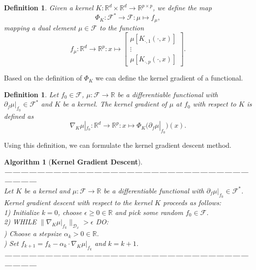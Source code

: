\documentclass[11pt, a4paper]{article}
\newtheorem{definition}[theorem]{Definition}
\newtheorem{algorithm}[theorem]{Algorithm}
\newcommand{\R}{\mathds{R}}
\newcommand{\D}{\mathcal{D}}
\newcommand{\F}{\mathcal{F}}
\begin{document}
\begin{definition}
Given a kernel $K: \R^d \times \R^d \to \R^{p \times p}$, we define the map
\[ \Phi_K : \F^* \to \F : \mu \mapsto f_{\mu}, \]
mapping a dual element $\mu \in \F$ to the function
\[ f_{\mu} : \R^d \to \R^p : x \mapsto \begin{bmatrix} \mu [K_{\cdot,1}(\cdot,x) ] \\ \vdots \\ \mu [ K_{\cdot,p}(\cdot,x)] \end{bmatrix}. \]
\end{definition}

Based on the definition of $\Phi_K$ we can define the kernel gradient of a functional.

\begin{definition}
Let $f_0 \in \F$, $\mu : \F \to \R$ be a differentiable functional with $\partial_f\mu|_{f_0} \in \F^*$ and $K$ be a kernel. The kernel gradient of $\mu$ at $f_0$ with respect to $K$ is defined as
\[ \nabla_K\mu|_{f_0}: \R^d \to \R^p : x \mapsto \Phi_K \Big ( \partial_f\mu|_{f_0} \Big )(x). \]
\end{definition}

Using this definition, we can formulate the kernel gradient descent method.

\begin{algorithm}[\textbf{Kernel Gradient Descent}] \ \\
\textbf{------------------------------------------------------------------------------------------------------} \\
Let $K$ be a kernel and $\mu: \F \to \R$ be a differentiable functional with $\partial_f\mu|_{f_0} \in \F^*$. Kernel gradient descent with respect to the kernel $K$ proceeds as follows: \\

1) Initialize $k=0$, choose $\epsilon \geq 0 \in \R$ and pick some random $f_0 \in \F$. \\

2) WHILE $ \big \| \nabla_K \mu|_{f_k} \big \|_{\D_x} > \epsilon $ DO:\\

) Choose a stepsize $\alpha_k > 0 \in \R$. \\

) Set $f_{k+1} = f_k - \alpha_k \cdot \nabla_K \mu|_{f_k}$ and $k = k+1$. \\
\textbf{------------------------------------------------------------------------------------------------------}
\end {algorithm}
\end{document}

